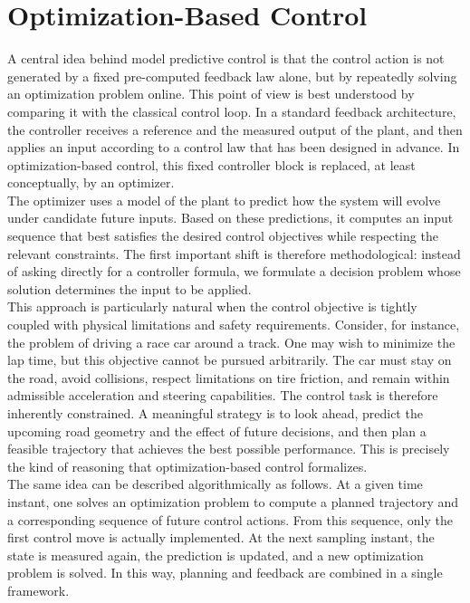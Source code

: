 \section{Optimization-Based Control}

A central idea behind model predictive control is that the control action is not generated by a fixed pre-computed feedback law alone, but by repeatedly solving an optimization problem online. This point of view is best understood by comparing it with the classical control loop. In a standard feedback architecture, the controller receives a reference and the measured output of the plant, and then applies an input according to a control law that has been designed in advance. In optimization-based control, this fixed controller block is replaced, at least conceptually, by an optimizer.\\

The optimizer uses a model of the plant to predict how the system will evolve under candidate future inputs. Based on these predictions, it computes an input sequence that best satisfies the desired control objectives while respecting the relevant constraints. The first important shift is therefore methodological: instead of asking directly for a controller formula, we formulate a decision problem whose solution determines the input to be applied.\\
This approach is particularly natural when the control objective is tightly coupled with physical limitations and safety requirements. Consider, for instance, the problem of driving a race car around a track. One may wish to minimize the lap time, but this objective cannot be pursued arbitrarily. The car must stay on the road, avoid collisions, respect limitations on tire friction, and remain within admissible acceleration and steering capabilities. The control task is therefore inherently constrained. A meaningful strategy is to look ahead, predict the upcoming road geometry and the effect of future decisions, and then plan a feasible trajectory that achieves the best possible performance. This is precisely the kind of reasoning that optimization-based control formalizes.\\

The same idea can be described algorithmically as follows. At a given time instant, one solves an optimization problem to compute a planned trajectory and a corresponding sequence of future control actions. From this sequence, only the first control move is actually implemented. At the next sampling instant, the state is measured again, the prediction is updated, and a new optimization problem is solved. In this way, planning and feedback are combined in a single framework.

